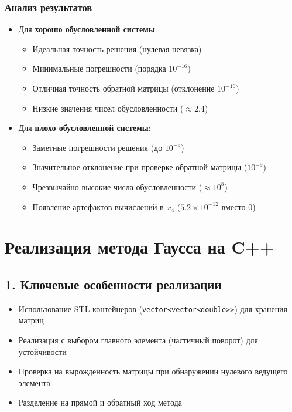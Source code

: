\documentclass[12pt, a4paper]{article}
\begin{document}
\subsubsection*{Анализ результатов}
\begin{itemize}
\item Для \textbf{хорошо обусловленной системы}:
\begin{itemize}
\item Идеальная точность решения (нулевая невязка)
\item Минимальные погрешности (порядка $10^{-16}$)
\item Отличная точность обратной матрицы (отклонение $10^{-16}$)
\item Низкие значения чисел обусловленности ($\approx 2.4$)
\end{itemize}

\item Для \textbf{плохо обусловленной системы}:
\begin{itemize}
\item Заметные погрешности решения (до $10^{-9}$)
\item Значительное отклонение при проверке обратной матрицы ($10^{-9}$)
\item Чрезвычайно высокие числа обусловленности ($\approx 10^8$)
\item Появление артефактов вычислений в $x_4$ ($5.2 \times 10^{-12}$ вместо 0)
\end{itemize}
\end{itemize}

\section*{Реализация метода Гаусса на C++}
\subsection*{1. Ключевые особенности реализации}

\begin{itemize}
\item Использование STL-контейнеров (\texttt{vector<vector<double>>}) для хранения матриц
\item Реализация с выбором главного элемента (частичный поворот) для устойчивости
\item Проверка на вырожденность матрицы при обнаружении нулевого ведущего элемента
\item Разделение на прямой и обратный ход метода
\end{itemize}
\end{document}
